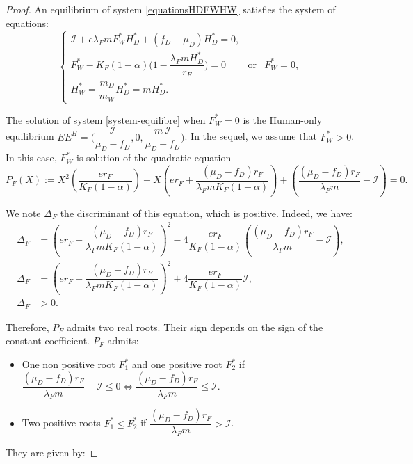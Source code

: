\documentclass{article}
\newcommand{\lfw}{\lambda_{F}}
\newcommand{\lfw}{\lambda_{F}}
\newcommand{\cI}{\mathcal{I}}
\begin{document}
\begin{proof}
An equilibrium of system \eqref{equationsHDFWHW} satisfies the system of equations:
\begin{equation}\label{system-equilibre}
\left\lbrace \begin{array}{cll}
\cI + e \lfw m F_W^* H_D^* + (f_D - \mu_D) H_D^* = 0,&&\\
F_W^* - K_F(1-\alpha) \Big(1 - \dfrac{\lfw m H^*_D}{r_F} \Big) = 0& \mbox{or} & F^*_W = 0,\\
H_W^* = \dfrac{m_D}{m_W} H_D^* = m H_D^*.&&
\end{array} \right.
\end{equation}

The solution of system \eqref{system-equilibre} when $F_W^* = 0$ is the Human-only equilibrium $EE^{H} = \Big(\dfrac{\cI}{\mu_D - f_D}, 0, \dfrac{m \ \cI}{\mu_D - f_D} \Big)$.
In the sequel, we assume that $F_W^* > 0$. In this case, $F^*_W$ is solution of the quadratic equation
\begin{equation}
P_F(X) := X^2 \left(\dfrac{er_F}{K_F(1-\alpha)} \right) - X \left(er_F + \dfrac{(\mu_D - f_D) r_F}{\lfw m K_F(1-\alpha)} \right) + \left(\dfrac{(\mu_D - f_D) r_F}{\lfw m} - \cI \right) = 0.
\label{polynome-Feq}
\end{equation}

We note $\Delta_F$ the discriminant of this equation, which is positive. Indeed, we have:
\begin{align*}
\Delta_F &= \left(er_F + \dfrac{(\mu_D - f_D) r_F}{\lfw m K_F(1-\alpha)} \right)^2 - 4\dfrac{er_F}{K_F(1-\alpha)}  \left(\dfrac{(\mu_D -f_D) r_F}{\lfw m} - \cI \right), \\
\Delta_F &= \left(er_F - \dfrac{(\mu_D - f_D) r_F}{\lfw m K_F(1-\alpha)} \right)^2 + 4\dfrac{er_F}{K_F(1-\alpha)}  \cI, \\
\Delta_F & > 0.
\end{align*}

Therefore, $P_F$ admits two real roots. Their sign depends on the sign of the constant coefficient. $P_F$ admits:
\begin{itemize}
\item One non positive root $F^*_1$ and one positive root $F^*_2$ if $\dfrac{(\mu_D - f_D) r_F}{\lfw m} - \cI \leq 0 \Leftrightarrow \dfrac{(\mu_D - f_D) r_F}{\lfw m } \leq \cI.$
\item Two positive roots $F^*_1\leq  F^*_2$ if $\dfrac{(\mu_D - f_D) r_F}{\lfw m } > \cI$.
\end{itemize}
They are given by:


\end{proof}
\end{document}

